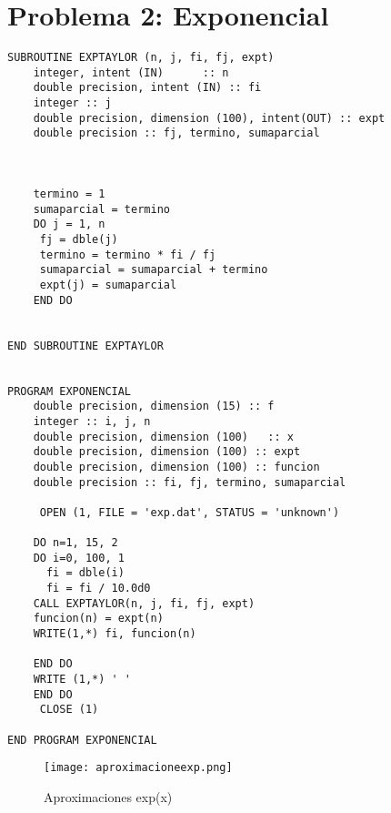 \documentclass{article}
\begin{document}
\section{Problema 2: Exponencial}
\begin{verbatim}
SUBROUTINE EXPTAYLOR (n, j, fi, fj, expt)
	integer, intent (IN)      :: n
	double precision, intent (IN) :: fi
	integer :: j
	double precision, dimension (100), intent(OUT) :: expt
	double precision :: fj, termino, sumaparcial
	
	
	
	termino = 1
	sumaparcial = termino
	DO j = 1, n
	 fj = dble(j)
	 termino = termino * fi / fj
	 sumaparcial = sumaparcial + termino
	 expt(j) = sumaparcial
	END DO

	 
END SUBROUTINE EXPTAYLOR
	 

PROGRAM EXPONENCIAL
	double precision, dimension (15) :: f
	integer :: i, j, n
	double precision, dimension (100)   :: x
	double precision, dimension (100) :: expt
	double precision, dimension (100) :: funcion
	double precision :: fi, fj, termino, sumaparcial

     OPEN (1, FILE = 'exp.dat', STATUS = 'unknown')
	
	DO n=1, 15, 2
	DO i=0, 100, 1
	  fi = dble(i)
	  fi = fi / 10.0d0
	CALL EXPTAYLOR(n, j, fi, fj, expt)
	funcion(n) = expt(n)
	WRITE(1,*) fi, funcion(n)

	END DO
	WRITE (1,*) ' '
	END DO
     CLOSE (1)

END PROGRAM EXPONENCIAL

\end{verbatim}

\begin{figure}
  \texttt{[image: aproximacioneexp.png]}
  \caption{Aproximaciones exp(x)}
\end{figure}


\clearpage
\end{document}
